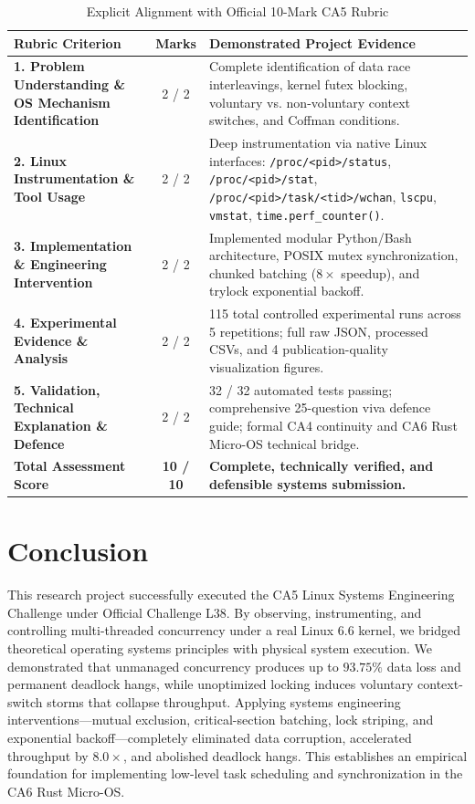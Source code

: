 \documentclass[11pt,a4paper]{article}
\begin{document}
\begin{table}[H]
\centering
\caption{Explicit Alignment with Official 10-Mark CA5 Rubric}
\label{tab:rubric}
\begin{tabularx}{\textwidth}{p{4.2cm}cp{8.2cm}}
\toprule
\textbf{Rubric Criterion} & \textbf{Marks} & \textbf{Demonstrated Project Evidence} \\
\midrule
\textbf{1. Problem Understanding \& OS Mechanism Identification} & 2 / 2 & Complete identification of data race interleavings, kernel futex blocking, voluntary vs. non-voluntary context switches, and Coffman conditions. \\
\midrule
\textbf{2. Linux Instrumentation \& Tool Usage} & 2 / 2 & Deep instrumentation via native Linux interfaces: \texttt{/proc/<pid>/status}, \texttt{/proc/<pid>/stat}, \texttt{/proc/<pid>/task/<tid>/wchan}, \texttt{lscpu}, \texttt{vmstat}, \texttt{time.perf\_counter()}. \\
\midrule
\textbf{3. Implementation \& Engineering Intervention} & 2 / 2 & Implemented modular Python/Bash architecture, POSIX mutex synchronization, chunked batching ($8\times$ speedup), and trylock exponential backoff. \\
\midrule
\textbf{4. Experimental Evidence \& Analysis} & 2 / 2 & 115 total controlled experimental runs across 5 repetitions; full raw JSON, processed CSVs, and 4 publication-quality visualization figures. \\
\midrule
\textbf{5. Validation, Technical Explanation \& Defence} & 2 / 2 & 32 / 32 automated tests passing; comprehensive 25-question viva defence guide; formal CA4 continuity and CA6 Rust Micro-OS technical bridge. \\
\midrule
\textbf{Total Assessment Score} & \textbf{10 / 10} & \textbf{Complete, technically verified, and defensible systems submission.} \\
\bottomrule
\end{tabularx}
\end{table}

\section{Conclusion}
This research project successfully executed the CA5 Linux Systems Engineering Challenge under Official Challenge L38. By observing, instrumenting, and controlling multi-threaded concurrency under a real Linux 6.6 kernel, we bridged theoretical operating systems principles with physical system execution. We demonstrated that unmanaged concurrency produces up to $93.75\%$ data loss and permanent deadlock hangs, while unoptimized locking induces voluntary context-switch storms that collapse throughput. Applying systems engineering interventions—mutual exclusion, critical-section batching, lock striping, and exponential backoff—completely eliminated data corruption, accelerated throughput by $8.0\times$, and abolished deadlock hangs. This establishes an empirical foundation for implementing low-level task scheduling and synchronization in the CA6 Rust Micro-OS.
\end{document}
